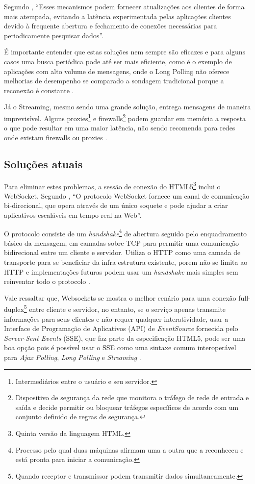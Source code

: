 Segundo , “Esses mecanismos podem fornecer atualizações aos clientes de forma mais atempada, evitando a latência experimentada pelas aplicações clientes devido à frequente abertura e fechamento de conexões necessárias para periodicamente pesquisar dados”.

É importante entender que estas soluções nem sempre são eficazes e para alguns casos uma busca periódica pode até ser mais eficiente, como é o exemplo de aplicações com alto volume de mensagens, onde o Long Polling não oferece melhorias de desempenho se comparado a sondagem tradicional porque a reconexão é constante \cite{Wang2013}.

Já o Streaming, mesmo sendo uma grande solução, entrega mensagens de maneira imprevisível. Alguns proxies\footnote{Intermediários entre o usuário e seu servidor.} e firewalls\footnote{Dispositivo de segurança da rede que monitora o tráfego de rede de entrada e saída e decide permitir ou bloquear tráfegos específicos de acordo com um conjunto definido de regras de segurança.} podem guardar em memória a resposta o que pode resultar em uma maior latência, não sendo recomenda para redes onde existam firewalls ou proxies \cite[p.~6]{Wang2013}.

\subsection{Soluções atuais}

Para eliminar estes problemas, a sessão de conexão do HTML5\footnote{Quinta versão da linguagem HTML.} inclui o WebSocket. Segundo , “O protocolo WebSocket fornece um canal de comunicação bi-direcional, que opera através de um único soquete e pode ajudar a criar aplicativos escaláveis em tempo real na Web”.

O protocolo consiste de um \emph{handshake}\footnote{Processo pelo qual duas máquinas afirmam uma a outra que a reconheceu e está pronta para iniciar a comunicação.} de abertura seguido pelo enquadramento básico da mensagem, em camadas sobre TCP para permitir uma comunicação bidirecional entre um cliente e servidor. Utiliza o HTTP como uma camada de transporte para se beneficiar da infra estrutura existente, porem não se limita ao HTTP e implementações futuras podem usar um \emph{handshake} mais simples sem reinventar todo o protocolo \cite{Saint-Andre2011}.

Vale ressaltar que, Websockets se mostra o melhor cenário para uma conexão full-duplex\footnote{Quando receptor e transmissor podem transmitir dados simultaneamente.} entre cliente e servidor, no entanto, se o serviço apenas transmite informações para seus clientes e não requer qualquer interatividade, usar a Interface de Programação de Aplicativos (API) de \emph{EventSource} fornecida pelo \emph{Server-Sent Events} (SSE), que faz parte da especificação HTML5, pode ser uma boa opção pois é possível usar o SSE como uma sintaxe comum interoperável para \emph{Ajax Polling}, \emph{Long Polling} e \emph{Streaming} \cite[p.~10-11]{Wang2013}.